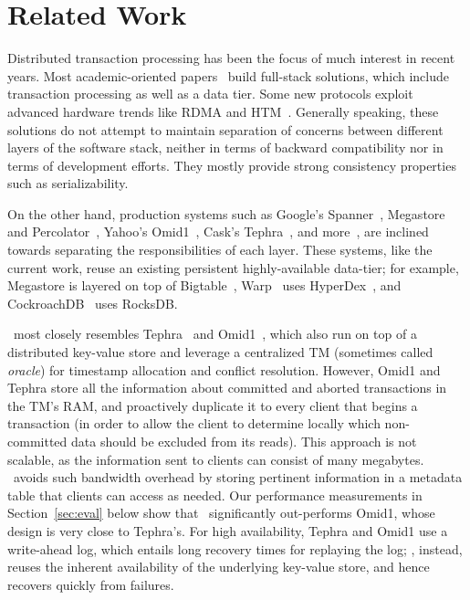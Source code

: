 \section{Related Work}
\label{sec:related}

Distributed transaction processing has been the focus of much interest in recent years. Most academic-oriented papers~\cite{Aguilera2015, Aguilera2007, Balakrishnan2013, Cowling2012, Dragojevic2015, Thomson2012, DBLP:conf/sosp/ZhangSSKP15} build full-stack solutions, 
which include transaction processing as well as a data tier. Some new protocols exploit advanced hardware trends like RDMA and HTM~\cite{Dragojevic2014, Dragojevic2015, Wei2015}. Generally speaking, these solutions do not attempt to maintain separation of concerns between different layers of the software stack, neither in terms of backward compatibility nor in terms of development efforts. They mostly provide strong consistency properties such as serializability.

On the other hand, production systems such as Google's Spanner~\cite{Spanner2012}, Megastore~\cite{Megastore} and Percolator~\cite{Percolator2010}, 
Yahoo's Omid1~\cite{OmidICDE2014},  Cask's Tephra~\cite{Tephra}, 
and more~\cite{Warp,PattersonENAA12,cockroach}, are inclined towards separating the responsibilities of each layer. These  systems, like the current work, reuse 
an existing persistent highly-available data-tier;
for example, Megastore is layered on top of Bigtable~\cite{Chang2008},  Warp~\cite{Warp} uses HyperDex~\cite{Escriva2012},
and CockroachDB~\cite{cockroach} uses RocksDB. 

\sys\ most closely resembles Tephra~\cite{Tephra} and Omid1~\cite{OmidICDE2014}, which also run on top of a distributed key-value store and leverage a centralized TM (sometimes called \emph{oracle}) for timestamp allocation and conflict resolution. 
However, 
Omid1 and Tephra  store all the information about committed and aborted transactions in the TM's RAM, and  proactively duplicate it to every client that begins a transaction (in order to allow the client to determine locally which non-committed data should be excluded from its reads). 
This approach is not scalable, as the information sent to clients can consist of many megabytes. 
\sys\ avoids such bandwidth overhead by storing pertinent information in a metadata table that clients can access as needed.
Our performance measurements in Section~\ref{sec:eval} below show that \sys\ significantly out-performs Omid1, whose design is very close to Tephra's. 
For high availability, Tephra and Omid1 use a write-ahead log, which entails long recovery times for replaying the log; 
\sys, instead, reuses the inherent availability of the underlying key-value store, and  hence recovers quickly from  failures.

